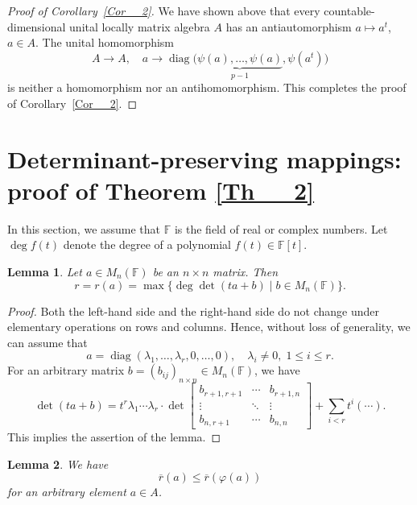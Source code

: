 \documentclass[12pt]{amsart}
\newtheorem{lemma}{Lemma}
\begin{document}
{\begin{proof}[Proof of Corollary~\ref{Cor__2}]
		
		We have shown above that every countable-dimensional unital locally matrix algebra $A$ 	has an antiautomorphism $a \mapsto a^t$, $a \in A$.  	The unital homomorphism
		\[
		A \to A, \quad a \to \operatorname{diag}\bigl(	\underbrace{\psi(a), \ldots, \psi(a)}_{p-1}, \psi(a^t)\bigr)
		\]
		is neither a homomorphism nor an antihomomorphism.  
		This completes the proof of Corollary~\ref{Cor__2}. \end{proof}
		
	
		\section{Determinant-preserving mappings: proof of Theorem \ref{Th__2}}
		
	
		
		In this section, we assume that $\mathbb{F}$ is the field of real  	or complex numbers.  
		Let $\deg f(t)$ denote the degree of a polynomial $f(t) \in \mathbb{F}[t]$.
		

		\begin{lemma}\label{Lem__2}
		Let $a \in M_n(\mathbb{F})$ be an $n\times n$  matrix.
		Then
		\[
		r = r(a) = \max \{ \deg \det (ta + b) \mid b \in M_n(\mathbb{F}) \}.
		\] \end{lemma}
		

			\begin{proof}	Both the left-hand side and the right-hand side do not change under elementary operations on rows and columns. Hence, without loss of generality, we can assume that
		\[
		a = \operatorname{diag}(\lambda_1, \ldots, \lambda_r, 0, \ldots, 0),
		\quad \lambda_i \neq 0, \; 1 \le i \le r.
		\]
		For an arbitrary matrix $b = (b_{ij})_{n \times n} \in M_n(\mathbb{F})$, we have
		\[
		\det(ta + b) = t^r \lambda_1 \cdots \lambda_r \cdot 
		\det
		\begin{bmatrix}
			b_{r+1, r+1} & \cdots & b_{r+1, n} \\
			\vdots & \ddots & \vdots \\
			b_{n, r+1} & \cdots & b_{n,n}
		\end{bmatrix}
		+ \sum_{i < r} t^i (\cdots).
		\]
		This implies the assertion of the lemma. 	\end{proof}
		
	
		
		\begin{lemma}\label{Lem__3}		We have 
				\begin{equation}\label{Eq__2} \overline{r}(a) \le \overline{r}(\varphi(a)) 	\end{equation}
					 for an arbitrary element $a \in A$.	\end{lemma}
		
}
\end{document}
